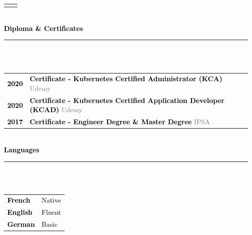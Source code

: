 \documentclass[12pt,A4]{article}
\begin{document}
\begin{minipage}[t]{0.68\textwidth}
\begin{tabular}{P{2.5cm}p{10cm}}
\begin{itemize}
\end{itemize}\\
\end{tabular}
%
%
\vspace*{1cm}\\
\textcolor{black}{\large \bf Diploma \& Certificates \vspace{-5pt}\\}
\noindent\textcolor{blue}{\rule{13cm}{.8mm}}\\
%
\vspace*{-5pt}\\
\begin{tabular}{P{2.5cm}p{10cm}}
\textcolor{black}{\bf 2020} & \textcolor{black}{ \bf Certificate - Kubernetes Certified Administrator (KCA)}  \newline \small \textcolor{gray}{Udemy} \\
\textcolor{black}{\bf 2020} & \textcolor{black}{ \bf Certificate - Kubernetes Certified Application Developer (KCAD)} \newline \small \textcolor{gray}{Udemy} \\
\textcolor{black}{\bf 2017} & \textcolor{black}{ \bf Certificate - Engineer Degree \& Master Degree} \newline \small \textcolor{gray}{IPSA} \\
\end{tabular}
%
%
\vspace*{1cm}\\
\textcolor{black}{\large \bf Languages \vspace{-5pt}\\}
\noindent\textcolor{blue}{\rule{13cm}{.8mm}}\\
%
\vspace*{-5pt}\\
\begin{tabular}{p{2.5cm}p{10cm}}
\textcolor{black}{\bf French} & \textcolor{black}{ Native } \\
\textcolor{black}{\bf English} & \textcolor{black}{ Fluent } \\
\textcolor{black}{\bf German} & \textcolor{black}{ Basic } \\
\end{tabular}
\end{minipage}
%
\begin{minipage}[t]{0.02\textwidth}
\hspace{1mm}
\end{minipage}
\end{document}

